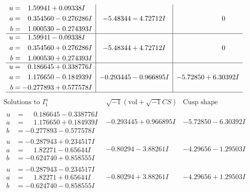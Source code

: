 \documentclass[1p]{elsarticle_modified}
\theoremstyle{definition}
\newcommand{\I}{\sqrt{-1}}
\begin{document}
$$\begin{array}{c|c|c}
\begin{aligned}
u &= \phantom{-}1.59941 + 0.09338 I \\
a &= \phantom{-}0.354560 - 0.276286 I \\
b &= \phantom{-}1.000530 - 0.274393 I\end{aligned}
 & -5.48344 - 4.72712 I & \phantom{-0.000000 } 0 \\ \hline\begin{aligned}
u &= \phantom{-}1.59941 - 0.09338 I \\
a &= \phantom{-}0.354560 + 0.276286 I \\
b &= \phantom{-}1.000530 + 0.274393 I\end{aligned}
 & -5.48344 + 4.72712 I & \phantom{-0.000000 } 0 \\ \hline\begin{aligned}
u &= \phantom{-}0.186645 + 0.338776 I \\
a &= \phantom{-}1.176650 - 0.184939 I \\
b &= -0.277893 + 0.577578 I\end{aligned}
 & -0.293445 - 0.966895 I & -5.72850 + 6.30392 I\\
 \hline 
 \end{array}$$\newpage$$\begin{array}{c|c|c}  
\text{Solutions to }I^u_{1}& \I (\text{vol} + \sqrt{-1}CS) & \text{Cusp shape}\\
 \hline 
\begin{aligned}
u &= \phantom{-}0.186645 - 0.338776 I \\
a &= \phantom{-}1.176650 + 0.184939 I \\
b &= -0.277893 - 0.577578 I\end{aligned}
 & -0.293445 + 0.966895 I & -5.72850 - 6.30392 I \\ \hline\begin{aligned}
u &= -0.287943 + 0.234517 I \\
a &= \phantom{-}1.82271 - 0.65644 I \\
b &= -0.624740 + 0.858555 I\end{aligned}
 & -0.80294 - 3.88261 I & -4.29656 - 1.29503 I \\ \hline\begin{aligned}
u &= -0.287943 - 0.234517 I \\
a &= \phantom{-}1.82271 + 0.65644 I \\
b &= -0.624740 - 0.858555 I\end{aligned}
 & -0.80294 + 3.88261 I & -4.29656 + 1.29503 I \\ \hline\begin{aligned}

\end{aligned}
\end{array}$$
\end{document}
